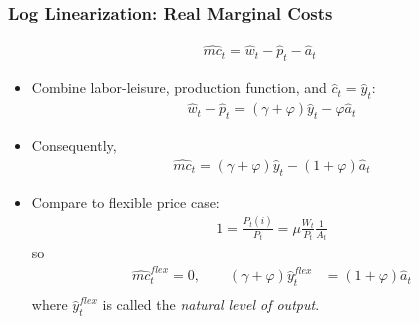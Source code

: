 \documentclass[11pt,aspectratio=169,xcolor={dvipsnames},hyperref={pdftex,pdfpagemode=UseNone,hidelinks,pdfdisplaydoctitle=true},usepdftitle=false]{beamer}
\begin{document}
\begin{frame}
\frametitle{Log Linearization: Real Marginal Costs
}
\begin{align*}
	\hat{mc}_t=\hat{w}_t-\hat{p}_t-\hat{a}_t
\end{align*}
\begin{itemize}
	\item Combine labor-leisure, production function, and $\hat{c}_t=\hat{y}_t$:
	\begin{align*}
		\hat{w}_t-\hat{p}_t=(\gamma+\varphi)\hat{y}_t-\varphi\hat{a}_t
\end{align*}
	\item Consequently,
	\begin{align*}
	\hat{mc}_t=(\gamma+\varphi)\hat{y}_t-(1+\varphi)\hat{a}_t
\end{align*}
\item Compare to flexible price case:
\begin{align*}
	1 = \frac{P_t(i)}{P_t} = \mu\frac{W_t}{P_t}\frac{1}{A_t} 
\end{align*}
so
\begin{align*}
	\hat{mc}_t^{flex} = 0,\qquad (\gamma+\varphi)\hat{y}_t^{flex}&=(1+\varphi)\hat{a}_t \\
\end{align*}
where $\hat{y}_t^{flex}$ is called the \emph{natural level of output}.
\end{itemize}
\end{frame}
\end{document}
